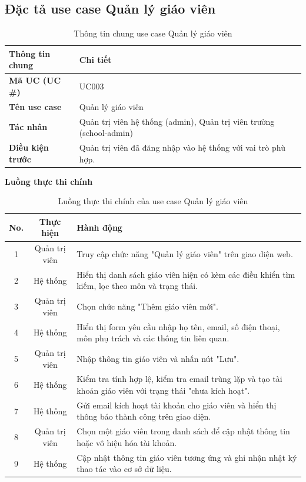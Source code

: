﻿\documentclass[../DoAn.tex]{subfiles}
\begin{document}
\subsection{Đặc tả use case Quản lý giáo viên}
\label{subsection:2.3.1}
\begin{table}[H]
\centering
\begin{tabular}{|p{4cm}|p{10cm}|}
\hline
\textbf{Thông tin chung} & \textbf{Chi tiết} \\ \hline
\textbf{Mã UC (UC \#)} & UC003 \\ \hline
\textbf{Tên use case} & Quản lý giáo viên \\ \hline
\textbf{Tác nhân} & Quản trị viên hệ thống (admin), Quản trị viên trường (school-admin) \\ \hline
\textbf{Điều kiện trước} & Quản trị viên đã đăng nhập vào hệ thống với vai trò phù hợp. \\ \hline
\end{tabular}
\caption{Thông tin chung use case Quản lý giáo viên}
\label{table:2.3.1_info}
\end{table}
\noindent\textbf{Luồng thực thi chính}
\begin{table}[H]
\centering
\begin{tabular}{|c|c|p{9cm}|}
\hline
\textbf{No.} & \textbf{Thực hiện} & \textbf{Hành động} \\ \hline
1 & Quản trị viên & Truy cập chức năng "Quản lý giáo viên" trên giao diện web. \\ \hline
2 & Hệ thống & Hiển thị danh sách giáo viên hiện có kèm các điều khiển tìm kiếm, lọc theo môn và trạng thái. \\ \hline
3 & Quản trị viên & Chọn chức năng "Thêm giáo viên mới". \\ \hline
4 & Hệ thống & Hiển thị form yêu cầu nhập họ tên, email, số điện thoại, môn phụ trách và các thông tin liên quan. \\ \hline
5 & Quản trị viên & Nhập thông tin giáo viên và nhấn nút "Lưu". \\ \hline
6 & Hệ thống & Kiểm tra tính hợp lệ, kiểm tra email trùng lặp và tạo tài khoản giáo viên với trạng thái "chưa kích hoạt". \\ \hline
7 & Hệ thống & Gửi email kích hoạt tài khoản cho giáo viên và hiển thị thông báo thành công trên giao diện. \\ \hline
8 & Quản trị viên & Chọn một giáo viên trong danh sách để cập nhật thông tin hoặc vô hiệu hóa tài khoản. \\ \hline
9 & Hệ thống & Cập nhật thông tin giáo viên tương ứng và ghi nhận nhật ký thao tác vào cơ sở dữ liệu. \\ \hline
\end{tabular}
\caption{Luồng thực thi chính của use case Quản lý giáo viên}
\label{table:2.3.1_main}
\end{table}
\end{document}
